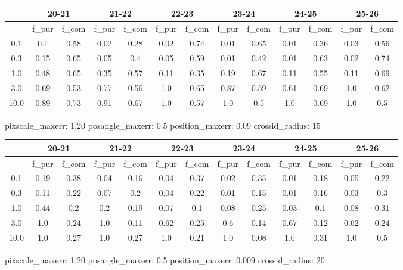\documentclass{article}
\begin{document}
\begin{figure}[H]
\centering
\begin{tabular}{|c|c|c|c|c|c|c|c|c|c|c|c|c|}
\hline
\multicolumn{1}{|c|}{} & \multicolumn{2}{|c|}{20-21} & \multicolumn{2}{|c|}{21-22} & \multicolumn{2}{|c|}{22-23} & \multicolumn{2}{|c|}{23-24} & \multicolumn{2}{|c|}{24-25} & \multicolumn{2}{|c|}{25-26}\\
\hline \hline
 & f\_pur & f\_com & f\_pur & f\_com & f\_pur & f\_com & f\_pur & f\_com & f\_pur & f\_com & f\_pur & f\_com \\
\hline
0.1 & 0.1 & 0.58 & 0.02 & 0.28 & 0.02 & 0.74 & 0.01 & 0.65 & 0.01 & 0.36 & 0.03 & 0.56\\
\hline
0.3 & 0.15 & 0.65 & 0.05 & 0.4 & 0.05 & 0.59 & 0.01 & 0.42 & 0.01 & 0.63 & 0.02 & 0.74\\
\hline
1.0 & 0.48 & 0.65 & 0.35 & 0.57 & 0.11 & 0.35 & 0.19 & 0.67 & 0.11 & 0.55 & 0.11 & 0.69\\
\hline
3.0 & 0.69 & 0.53 & 0.77 & 0.56 & 1.0 & 0.65 & 0.87 & 0.59 & 0.61 & 0.69 & 1.0 & 0.62\\
\hline
10.0 & 0.89 & 0.73 & 0.91 & 0.67 & 1.0 & 0.57 & 1.0 & 0.5 & 1.0 & 0.69 & 1.0 & 0.5\\
\hline
\end{tabular}
\caption{pixscale\_maxerr: 1.20 posangle\_maxerr: 0.5 position\_maxerr: 0.09 crossid\_radius: 15}
\end{figure}

\begin{figure}[H]
\centering
\begin{tabular}{|c|c|c|c|c|c|c|c|c|c|c|c|c|}
\hline
\multicolumn{1}{|c|}{} & \multicolumn{2}{|c|}{20-21} & \multicolumn{2}{|c|}{21-22} & \multicolumn{2}{|c|}{22-23} & \multicolumn{2}{|c|}{23-24} & \multicolumn{2}{|c|}{24-25} & \multicolumn{2}{|c|}{25-26}\\
\hline \hline
 & f\_pur & f\_com & f\_pur & f\_com & f\_pur & f\_com & f\_pur & f\_com & f\_pur & f\_com & f\_pur & f\_com \\
\hline
0.1 & 0.19 & 0.38 & 0.04 & 0.16 & 0.04 & 0.37 & 0.02 & 0.35 & 0.01 & 0.18 & 0.05 & 0.22\\
\hline
0.3 & 0.11 & 0.22 & 0.07 & 0.2 & 0.04 & 0.22 & 0.01 & 0.15 & 0.01 & 0.16 & 0.03 & 0.3\\
\hline
1.0 & 0.44 & 0.2 & 0.2 & 0.19 & 0.07 & 0.1 & 0.08 & 0.25 & 0.03 & 0.1 & 0.08 & 0.31\\
\hline
3.0 & 1.0 & 0.24 & 1.0 & 0.11 & 0.62 & 0.25 & 0.6 & 0.14 & 0.67 & 0.12 & 0.62 & 0.24\\
\hline
10.0 & 1.0 & 0.27 & 1.0 & 0.27 & 1.0 & 0.21 & 1.0 & 0.08 & 1.0 & 0.31 & 1.0 & 0.5\\
\hline
\end{tabular}
\caption{pixscale\_maxerr: 1.20 posangle\_maxerr: 0.5 position\_maxerr: 0.009 crossid\_radius: 20}
\end{figure}
\end{document}
